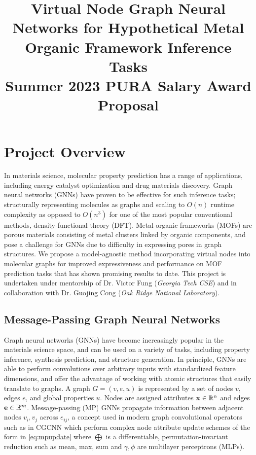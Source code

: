 \documentclass{lxaiproposal}
\title{Virtual Node Graph Neural Networks for Hypothetical Metal Organic Framework Inference Tasks\\ \large Summer 2023 PURA Salary Award Proposal}
\author{\coord{Sidharth Baskaran}{}{1}}
\begin{document}
\maketitle

\section*{Project Overview}

In materials science, molecular property prediction has a range of applications, including
energy catalyst optimization and drug materials discovery. Graph neural networks (GNNs) have proven to be effective for such inference tasks; structurally representing molecules as graphs and scaling to $O(n)$ runtime complexity as opposed to $O(n^3)$ for one of the most popular conventional methods, density-functional theory (DFT). Metal-organic frameworks (MOFs) are porous materials consisting of metal clusters linked by organic components, and pose a challenge for GNNs due to difficulty in expressing pores in graph structures. We propose a model-agnostic method incorporating virtual nodes into molecular graphs for improved expressiveness and performance on MOF prediction tasks that has shown promising results to date.
This project is undertaken under mentorship of Dr. Victor Fung (\textit{Georgia Tech CSE}) and in collaboration with Dr. Guojing Cong (\textit{Oak Ridge National Laboratory}).

\subsection*{Message-Passing Graph Neural Networks}

Graph neural networks (GNNs) have become increasingly popular in the materials science space, and can be used on a variety of tasks, including property inference, synthesis prediction, and structure generation\cite{Reiser2022}. In principle, GNNs are able to perform convolutions over arbitrary inputs with standardized feature dimensions, and offer the advantage of working with atomic structures that easily translate to graphs. A graph $G=(v,e,u)$ is represented by a set of nodes $v$, edges $e$, and global properties $u$. Nodes are assigned attributes ${\bf x}\in \mathbb{R}^{n}$ and edges ${\bf e}\in \mathbb{R}^m$. Message-passing (MP) GNNs propagate information between adjacent nodes $v_i,v_j$ across $e_{ij}$, a concept used in modern graph convolutional operators such as in CGCNN\cite{Xie_2018} which perform complex node attribute update schemes of the form in \ref{eq:mpupdate} where $\bigoplus$ is a differentiable, permutation-invariant reduction such as mean, max, sum and $\gamma,\phi$ are multilayer perceptrons (MLPs).
\end{document}
